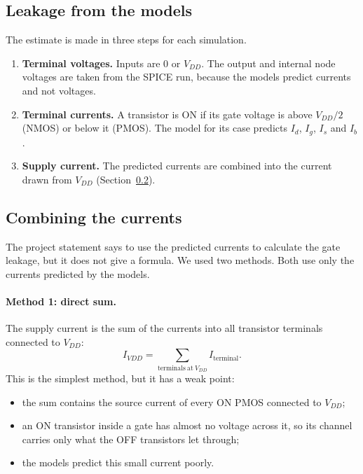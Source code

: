 \documentclass[11pt]{article}
\begin{document}
\subsection{Leakage from the models}

The estimate is made in three steps for each simulation.
\begin{enumerate}
    \item \textbf{Terminal voltages.} Inputs are 0 or $V_{DD}$. The output
          and internal node voltages are taken from the SPICE run, because
          the models predict currents and not voltages.
    \item \textbf{Terminal currents.} A transistor is ON if its gate voltage
          is above $V_{DD}/2$ (NMOS) or below it (PMOS). The model for its
          case predicts $I_d$, $I_g$, $I_s$ and $I_b$.
    \item \textbf{Supply current.} The predicted currents are combined into
          the current drawn from $V_{DD}$ (Section~\ref{sec:combine}).
\end{enumerate}

\subsection{Combining the currents}
\label{sec:combine}

The project statement says to use the predicted currents to calculate the
gate leakage, but it does not give a formula. We used two methods. Both use
only the currents predicted by the models.

\paragraph{Method 1: direct sum.}
The supply current is the sum of the currents into all transistor terminals
connected to $V_{DD}$:
\begin{equation}
I_{VDD} = \sum_{\mathrm{terminals\ at\ } V_{DD}} I_{\mathrm{terminal}}.
\end{equation}
This is the simplest method, but it has a weak point:
\begin{itemize}
    \item the sum contains the source current of every ON PMOS connected to
          $V_{DD}$;
    \item an ON transistor inside a gate has almost no voltage across it, so
          its channel carries only what the OFF transistors let through;
    \item the models predict this small current poorly.
\end{itemize}
\end{document}
